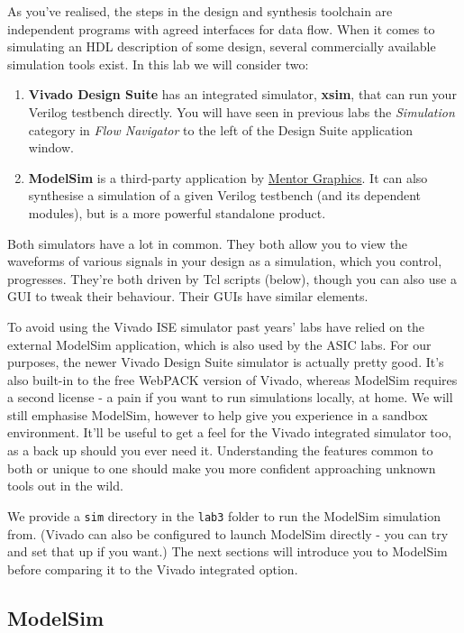 \documentclass[11pt]{article}
\begin{document}
As you've realised, the steps in the design and synthesis toolchain are independent programs with agreed interfaces for data flow. When it comes to simulating an HDL description of some design, several commercially available simulation tools exist. In this lab we will consider two:

\begin{enumerate}
  \item \textbf{Vivado Design Suite} has an integrated simulator, \textbf{xsim}, that can run your Verilog testbench directly. You will have seen in previous labs the \emph{Simulation} category in \emph{Flow Navigator} to the left of the Design Suite application window.
  \item \textbf{ModelSim} is a third-party application by \href{https://www.mentor.com/products/fv/modelsim/}{Mentor Graphics}. It can also synthesise a simulation of a given Verilog testbench (and its dependent modules), but is a more powerful standalone product.
\end{enumerate}

Both simulators have a lot in common. They both allow you to view the waveforms of various signals in your design as a simulation, which you control, progresses. They're both driven by Tcl scripts (below), though you can also use a GUI to tweak their behaviour. Their GUIs have similar elements.

To avoid using the Vivado ISE simulator past years' labs have relied on the external ModelSim application, which is also used by the ASIC labs. For our purposes, the newer Vivado Design Suite simulator is actually pretty good. It's also built-in to the free WebPACK version of Vivado, whereas ModelSim requires a second license - a pain if you want to run simulations locally, at home. We will still emphasise ModelSim, however to help give you experience in a sandbox environment. It'll be useful to get a feel for the Vivado integrated simulator too, as a back up should you ever need it. Understanding the features common to both or unique to one should make you more confident approaching unknown tools out in the wild.

We provide a \verb|sim| directory in the \verb|lab3| folder to run the ModelSim simulation from. (Vivado can also be configured to launch ModelSim directly - you can try and set that up if you want.) The next sections will introduce you to ModelSim before comparing it to the Vivado integrated option.

\subsection{ModelSim}
\end{document}
